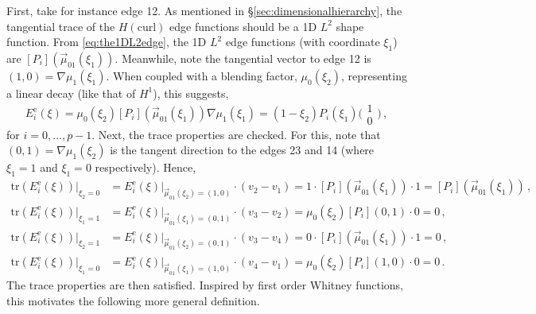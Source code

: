 First, take for instance edge 12.
As mentioned in \S\ref{sec:dimensionalhierarchy}, the tangential trace of the $H(\mathrm{curl})$ edge functions should be a 1D $L^2$ shape function.
From \eqref{eq:the1DL2edge}, the 1D $L^2$ edge functions (with coordinate $\xi_1$) are $[P_i](\vec{\mu}_{01}(\xi_1))$.
Meanwhile, note the tangential vector to edge 12 is $(1,0)=\nabla\mu_1(\xi_1)$.
When coupled with a blending factor, $\mu_0(\xi_2)$, representing a linear decay (like that of $H^1$), this suggests,
\begin{equation*}
    E_i^\mathrm{e}(\xi)=\mu_0(\xi_2)[P_i](\vec{\mu}_{01}(\xi_1))\nabla\mu_1(\xi_1)
    	=(1-\xi_2)P_i(\xi_1)\Big(\begin{smallmatrix}1\\[2pt]0\end{smallmatrix}\Big)\,,
\end{equation*}
for $i=0,\ldots,p-1$.
Next, the trace properties are checked.
For this, note that $(0,1)=\nabla\mu_1(\xi_2)$ is the tangent direction to the edges 23 and 14 (where $\xi_1=1$ and $\xi_1=0$ respectively). Hence,
\begin{align*}
    \mathrm{tr}(E_i^\mathrm{e}(\xi))|_{\xi_2=0}&=E_i^\mathrm{e}(\xi)|_{\vec{\mu}_{01}(\xi_2)=(1,0)}\cdot(v_2-v_1)
    		=1\cdot[P_i](\vec{\mu}_{01}(\xi_1))\cdot1=[P_i](\vec{\mu}_{01}(\xi_1))\,,\\
    \mathrm{tr}(E_i^\mathrm{e}(\xi))|_{\xi_1=1}&=E_i^\mathrm{e}(\xi)|_{\vec{\mu}_{01}(\xi_1)=(0,1)}\cdot(v_3-v_2)
    		=\mu_0(\xi_2)[P_i](0,1)\cdot0=0\,,\\
  	\mathrm{tr}(E_i^\mathrm{e}(\xi))|_{\xi_2=1}&=E_i^\mathrm{e}(\xi)|_{\vec{\mu}_{01}(\xi_2)=(0,1)}\cdot(v_3-v_4)
    		=0\cdot[P_i](\vec{\mu}_{01}(\xi_1))\cdot1=0\,,\\
    \mathrm{tr}(E_i^\mathrm{e}(\xi))|_{\xi_1=0}&=E_i^\mathrm{e}(\xi)|_{\vec{\mu}_{01}(\xi_1)=(1,0)}\cdot(v_4-v_1)
    		=\mu_0(\xi_2)[P_i](1,0)\cdot0=0\,.
\end{align*}
The trace properties are then satisfied. Inspired by first order Whitney functions, this motivates the following more general definition.


